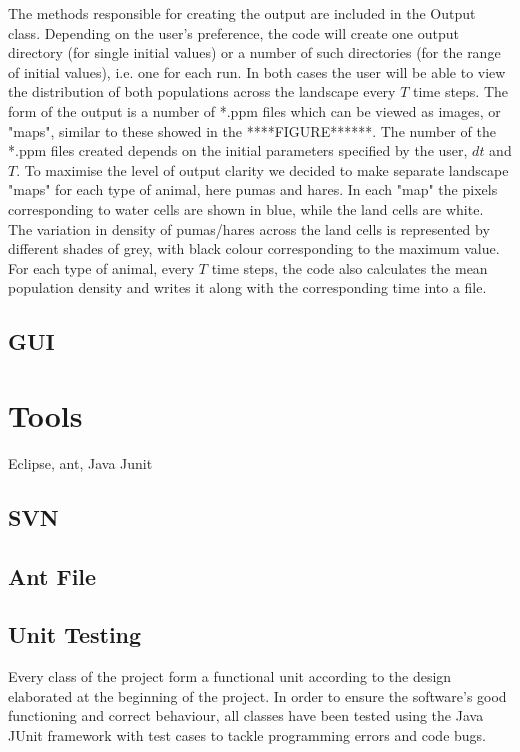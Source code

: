 \documentclass[11pt]{report}
\begin{document}
      The methods responsible for creating the output are included in the Output class. Depending on the user's preference, the code will create one output directory (for single initial values) or a number of such directories (for the range of initial values), i.e. one for each run. In both cases the user will be able to view the distribution of both populations across the landscape every $T$ time steps. The form of the output is a number of *.ppm files which can be viewed as images, or "maps", similar to these showed in the ****FIGURE******.
      \newline{}
      \newline{}
      The number of the *.ppm files created depends on the initial parameters specified by the user, $dt$ and $T$. To maximise the level of output clarity we decided to make separate landscape "maps" for each type of animal, here pumas and hares. In each "map" the pixels corresponding to water cells are shown in blue, while the land cells are white. The variation in density of pumas/hares across the land cells is represented by different shades of grey, with black colour corresponding to the maximum value. 
      \newline{}
      For each type of animal, every $T$ time steps, the code also calculates the mean population density and writes it along with the corresponding time into a file. 
      

      
      	
      
      
      \subsection{GUI} %
   
   \section{Tools}
Eclipse, ant, Java Junit 
      \subsection{SVN} %
      \subsection{Ant File} %
      \subsection{Unit Testing} %
      Every class of the project form a functional unit according to the design elaborated at the beginning of the project. In order to ensure the software's good functioning and correct behaviour, all classes have been tested using the Java JUnit framework with test cases to tackle programming errors and code bugs.
\end{document}
